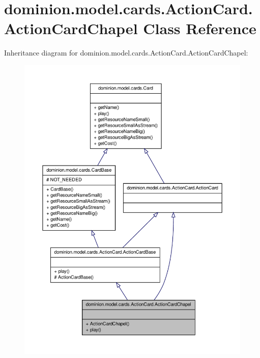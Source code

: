 \hypertarget{classdominion_1_1model_1_1cards_1_1ActionCard_1_1ActionCardChapel}{\section{dominion.\-model.\-cards.\-Action\-Card.\-Action\-Card\-Chapel \-Class \-Reference}
\label{classdominion_1_1model_1_1cards_1_1ActionCard_1_1ActionCardChapel}
}


\-Inheritance diagram for dominion.\-model.\-cards.\-Action\-Card.\-Action\-Card\-Chapel\-:
\nopagebreak
\begin{figure}[H]
\begin{center}
\leavevmode
\includegraphics[width=350pt]{classdominion_1_1model_1_1cards_1_1ActionCard_1_1ActionCardChapel__inherit__graph}
\end{center}
\end{figure}


